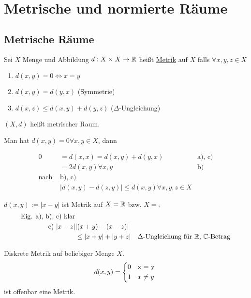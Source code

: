 \chapter{Metrische und normierte Räume}
\section{Metrische Räume}
\begin{mydefn}[Metrik]
    Sei $X$ Menge und Abbildung $d: X \times X \to \mathbb{R}$ heißt \underline{Metrik} auf $X$ falls $\forall x,y,z \in X$
    \begin{enumerate}[label={\alph*)}]
    \item $d(x,y) = 0 \Leftrightarrow x=y$ 
    \item $d(x,y) = d(y,x)$ (Symmetrie)
    \item $d(x,z) \leq d(x,y) + d(y,z)$ ($\Delta$-Ungleichung)
    \end{enumerate}
    $(X,d)$ heißt metrischer Raum.
\end{mydefn}
Man hat $d(x,y) = 0 \forall x,y \in X$, dann

\begin{align}
    0 &= d(x,x) = d(x,y) + d(y,x) & \text{a), c)}\nonumber\\
    & = 2d(x,y) \forall x,y & \text{b)}\nonumber\\
    \text{nach } & \text{b), c) } &\nonumber\\
    & \vert d(x,y) -d(z,y)\vert \leq d(x,y) \forall x,y,z \in X &
\end{align}

\begin{exmpn}[Standardmetrik]\label{8_1_exmp_metrik}
	$d(x,y) := \vert x-y\vert$ ist Metrik auf $X=\mathbb{R}$ bzw. $X=\comp$
    \begin{align*}
        \text{Eig. a), b), c) klar}& &\\
        \text{c) } \vert x-z\vert& \vert (x+y)-(x-z)\vert &\\
        &\leq \vert x+y\vert + \vert y+z\vert & \Delta\text{-Ungleichung für }\mathbb{R}\text{, }\mathbb{C}\text{-Betrag}
    \end{align*} 
\end{exmpn}

\begin{exmpn}
	Diskrete Metrik auf beliebiger Menge $X$.\\
    \[d(x,y) = 
    \begin{dcases*}
        0 & x = y\\
        1 & $x \neq y$
    \end{dcases*}\]
    ist offenbar eine Metrik.
\end{exmpn}

